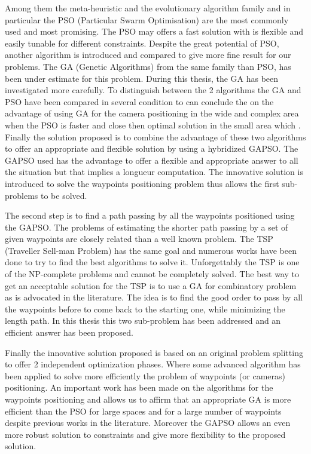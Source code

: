 Among them the meta-heuristic and the evolutionary algorithm family and in particular the PSO (Particular Swarm Optimisation) are the most commonly used and most promising.
 The PSO may offers a fast solution with is flexible and easily tunable for different constraints. Despite the great potential of PSO, another algorithm is introduced and compared to give more fine result for our problems.
The GA (Genetic Algorithms) from the same family than PSO, has been under estimate for this problem. During this thesis, the GA has been investigated more carefully. 
To distinguish  between the 2 algorithms the GA and PSO have been compared in several condition to can conclude the on the advantage of using GA for the camera positioning in the wide and complex area when the PSO is faster and close then optimal solution  in the small area which .
Finally the solution proposed is to combine the advantage of these two algorithms to offer an appropriate and flexible solution by using a hybridized GAPSO. 
The GAPSO used has the advantage to offer a flexible and appropriate answer to all the situation but that implies a longueur computation. 
The innovative solution is introduced to solve the waypoints positioning problem thus allows the first sub-problems to be solved.

The second step is to find a path passing by all the waypoints positioned using the GAPSO. The problems of estimating the shorter path passing by a set of given waypoints are closely related than a well known problem. The TSP (Traveller Sell-man Problem) has the same goal and numerous works have been done to try to find the best algorithms to solve it. Unforgettably the TSP is one of the NP-complete problems and cannot be completely solved. The best way to get an acceptable solution for the TSP is to use a GA for combinatory problem as is advocated in the literature. 
The idea is to find the good order to pass by all the waypoints before to come back to the starting one, while  minimizing the length path. 
In this thesis this two sub-problem has been addressed and an efficient answer has been proposed. 

Finally the innovative solution proposed is based on an original problem splitting to offer 2 independent optimization phases. Where some advanced algorithm has been applied to solve more efficiently the problem of waypoints (or cameras) positioning. An important work has been made on the algorithms for the waypoints positioning and allows us to affirm that an appropriate GA is more efficient than the PSO for large spaces and for a large number of waypoints despite previous works in the literature. Moreover the GAPSO allows an even more robust solution to constraints and give more flexibility to the proposed solution. 

